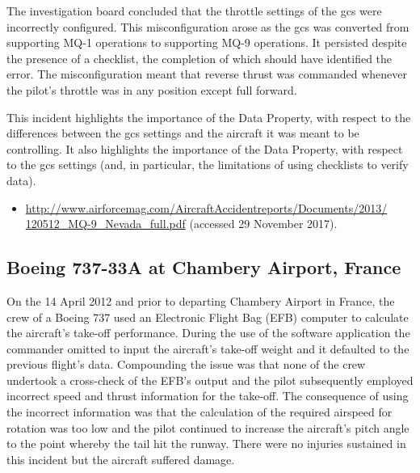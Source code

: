 The investigation board concluded that the throttle settings of the \gls{gcs} were incorrectly configured. This misconfiguration arose as the \gls{gcs} was converted from supporting MQ-1 operations to supporting MQ-9 operations. It persisted despite the presence of a checklist, the completion of which should have identified the error. The misconfiguration meant that reverse thrust was commanded whenever the pilot's throttle was in any position except full forward.

This incident highlights the importance of the  Data Property, with respect to the differences between the \gls{gcs} settings and the aircraft it was meant to be controlling. It also highlights the importance of the  Data Property, with respect to the \gls{gcs} settings (and, in particular, the limitations of using checklists to verify data).

\begin{samepage}
\begin{itemize}
	\item \raggedright{\href{http://www.airforcemag.com/AircraftAccidentreports/Documents/2013/120512_MQ-9_Nevada_full.pdf}{http://www.airforcemag.com/AircraftAccidentreports/Documents/2013/ 120512\_MQ-9\_Nevada\_full.pdf} (accessed 29 November 2017).}
\end{itemize}
\end{samepage}


\subsection{Boeing 737-33A at Chambery Airport, France} \label{bkm:incacc:737-33A} 
On the 14 April 2012 and prior to departing Chambery Airport in France, the crew of a Boeing 737 used an Electronic Flight Bag (EFB) computer to calculate the aircraft’s take-off performance. During the use of the software application the commander omitted to input the aircraft’s take-off weight and it defaulted to the previous flight’s data. Compounding the issue was that none of the crew undertook a cross-check of the EFB’s output and the pilot subsequently employed incorrect speed and thrust information for the take-off. The consequence of using the incorrect information was that the calculation of the required airspeed for rotation was too low and the pilot continued to increase the aircraft’s pitch angle to the point whereby the tail hit the runway. There were no injuries sustained in this incident but the aircraft suffered damage.


